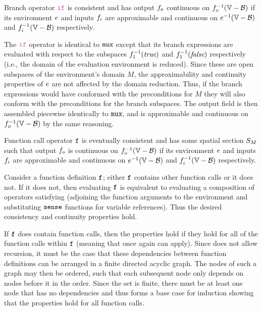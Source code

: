 \documentclass[12pt,a4paper,twoside,openright]{book}
\begin{document}
\begin{appendices}
\begin{lem}\label{thm:if}
  Branch operator $\ifN$ is consistent and has output $f_o$ continuous on $\validdomain{\field_o}$ if its environment $e$ and inputs $f_i$ are approximable and continuous on $\validdomain{\environment}$ and $\validdomain{\field_i}$ respectively.
\end{lem}
  The $\ifN$ operator is identical to $\texttt{mux}$ except that its branch expressions are evaluated with respect to the subspaces $f_1^{-1}(\textit{true})$ and $f_1^{-1}(\textit{false})$ respectively (i.e., the domain of the evaluation environment is reduced).
  Since these are open subspaces of the environment's domain $M$, the approximability and continuity properties of $e$ are not affected by the domain reduction.
  Thus, if the branch expressions would have conformed with the preconditions for $M$ they will also conform with the preconditions for the branch subspaces.
  The output field is then assembled piecewise identically to $\texttt{mux}$, and is approximable and continuous on $\validdomain{\field_o}$ by the same reasoning.

\begin{lem}\label{thm:fun}
  Function call operator $\texttt{f}$ is eventually consistent and has some spatial section $S_{M}$ such that output $f_o$ is continuous on $\validdomain{\field_o}$ if its environment $e$ and inputs $f_i$ are approximable and continuous on $\validdomain{\environment}$ and $\validdomain{\field_i}$ respectively.
\end{lem}
  Consider a function definition $\texttt{f}$; either $\texttt{f}$ contains other function calls or it does not.
  If it does not, then evaluating $\texttt{f}$ is equivalent to evaluating a composition of operators satisfying  (adjoining the function arguments to the environment and substituting $\texttt{sense}$ functions for variable references).
  Thus the desired consistency and continuity properties hold.
  
  If $\texttt{f}$ does contain function calls, then the properties hold if they hold for all of the function calls within $\texttt{f}$ (meaning that once again  can apply).
  Since \calculus{} does not allow recursion, it must be the case that these dependencies between function definitions can be arranged in a finite directed acyclic graph.
  The nodes of such a graph may then be ordered, such that each subsequent node only depends on nodes before it in the order.
  Since the set is finite, there must be at least one node that has no dependencies and thus forms a base case for induction showing that the properties hold for all function calls.


\end{appendices}
\end{document}
